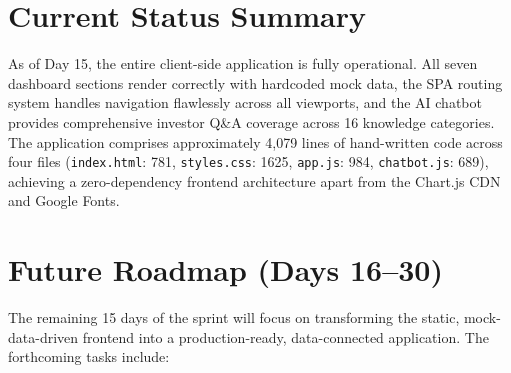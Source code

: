 \documentclass{book}
\begin{document}
\section{Current Status Summary}
As of Day 15, the entire client-side application is fully operational. All seven dashboard sections render correctly with hardcoded mock data, the SPA routing system handles navigation flawlessly across all viewports, and the AI chatbot provides comprehensive investor Q\&A coverage across 16 knowledge categories. The application comprises approximately 4,079 lines of hand-written code across four files (\texttt{index.html}: 781, \texttt{styles.css}: 1625, \texttt{app.js}: 984, \texttt{chatbot.js}: 689), achieving a zero-dependency frontend architecture apart from the Chart.js CDN and Google Fonts.

\section{Future Roadmap (Days 16--30)}
The remaining 15 days of the sprint will focus on transforming the static, mock-data-driven frontend into a production-ready, data-connected application. The forthcoming tasks include:
\end{document}
